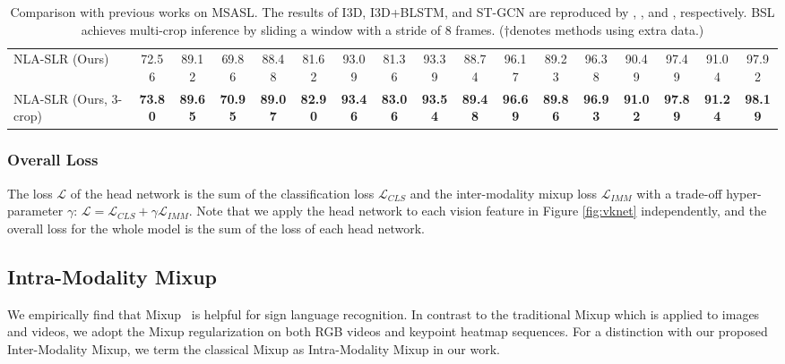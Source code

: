 \documentclass[10pt,twocolumn,letterpaper]{article}
\def \tbf{\textbf}
\begin{document}
\begin{table*}[t]
{\begin{tabular}{l|cc|cc|cc|cc|cc|cc|cc|cc}
NLA-SLR (Ours) & 72.56 & 89.12 & 69.86 & 88.48 & 81.62 & 93.09 & 81.36 & 93.39 & 88.74 & 96.17 & 89.23 & 96.38 & 90.49 & 97.49 & 91.04 & 97.92 \\
NLA-SLR (Ours, 3-crop) & \tbf{73.80} & \tbf{89.65} & \tbf{70.95} & \tbf{89.07} & \tbf{82.90} & \tbf{93.46} & \tbf{83.06} & \tbf{93.54} & \tbf{89.48} & \tbf{96.69} & \tbf{89.86} & \tbf{96.93} & \tbf{91.02} & \tbf{97.89} & \tbf{91.24} & \tbf{98.19} \\
\bottomrule
\end{tabular}}
\vspace{-3mm}
\caption{Comparison with previous works on MSASL. The results of I3D, I3D+BLSTM, and ST-GCN are reproduced by \cite{joze2019ms}, \cite{adaloglou2021comprehensive}, and \cite{hu2021signbert}, respectively. BSL achieves multi-crop inference by sliding a window with a stride of 8 frames. ($\dagger$denotes methods using extra data.)}
\vspace{-5mm}
\label{tab:sota_msasl}
\end{table*}


\vspace{-4mm}
\subsubsection{Overall Loss}
\vspace{-2mm}
\label{sec:overall_loss}
The loss $\mathcal{L}$ of the head network is the sum of the classification loss $\mathcal{L}_{CLS}$ and the inter-modality mixup loss $\mathcal{L}_{IMM}$ with a trade-off hyper-parameter $\gamma$: $\mathcal{L} = \mathcal{L}_{CLS} + \gamma \mathcal{L}_{IMM}$.
Note that we apply the head network to each vision feature in Figure \ref{fig:vknet} independently, and the overall loss for the whole model is the sum of the loss of each head network.

\subsection{Intra-Modality Mixup}
\label{sec:intra}
We empirically find that Mixup~\cite{zhang2018mixup} is helpful for sign language recognition. In contrast to the traditional Mixup which is applied to images and videos, we adopt the Mixup regularization on both RGB videos and keypoint heatmap sequences. For a distinction with our proposed Inter-Modality Mixup, we term the classical Mixup as Intra-Modality Mixup in our work.
\end{document}
